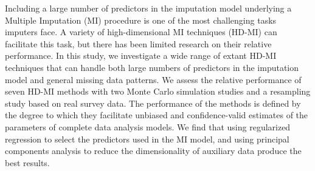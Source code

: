 
Including a large number of predictors in the imputation model underlying a Multiple Imputation (MI) 
procedure is one of the most challenging tasks imputers face.
A variety of high-dimensional MI techniques (HD-MI) can facilitate this task, but there has been 
limited research on their relative performance.
In this study, we investigate a wide range of extant HD-MI techniques 
that can handle both large numbers of predictors in the imputation model and general missing data patterns.
We assess the relative performance of seven HD-MI methods with two Monte Carlo simulation studies and a 
resampling study based on real survey data.
The performance of the methods is defined by the degree to which they facilitate unbiased and confidence-valid estimates of the parameters of complete data analysis models.
We find that using regularized regression to select the predictors used in the MI model, and using principal components analysis to reduce the dimensionality of auxiliary data produce the best results.